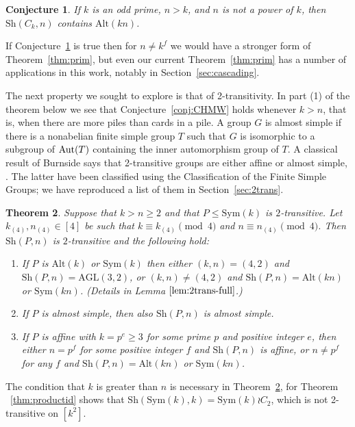 \documentclass[12pt]{amsart}
\newtheorem{thm}{Theorem}[section]
\newtheorem{conj}[thm]{Conjecture}
\theoremstyle{remark}
\theoremstyle{definition}
\newcommand{\sym}{\mathrm{Sym}}
\newcommand{\alt}{\mathrm{Alt}}
\newcommand{\sh}{\mathrm{Sh}}
\newcommand{\AGL}{\mathrm{AGL}}
\newcommand{\aut}{\textnormal{Aut}}
\begin{document}
\begin{conj}\label{conj1}
If $k$ is an odd prime, $n>k$, and $n$ is not a power of $k$, then $\sh(C_k,n)$ contains $\alt(kn)$.
\end{conj}

If Conjecture~\ref{conj1} is true then for $n\neq k^f$ we would have a stronger form of Theorem~\ref{thm:prim}, but even our current 
Theorem~\ref{thm:prim} has a number of applications in this work, notably in Section~\ref{sec:cascading}.

 
The next property we sought to explore is that of 2-transitivity. In part (1) of the theorem below we see that Conjecture~\ref{conj:CHMW} holds whenever $k>n$, that is, when there are more piles than cards in a pile.   A group $G$ is almost simple if there is a nonabelian finite  simple group  $T$ such that $G$ is isomorphic to a subgroup of $\aut(T)$ containing the inner automorphism group of $T$. A classical result of Burnside says that 2-transitive groups are either affine or almost simple, \cite[Theorem 4.1B]{dixmort}.  The latter have been classified using the Classification of the Finite Simple Groups; we have reproduced a list of them in Section~\ref{sec:2trans}.

\begin{thm} \label{thm:2trans}
Suppose that $k>n \geqslant 2$ and that $P\leqslant \sym(k)$ is $2$-transitive. Let $k_{(4)}, n_{(4)} \in [4]$ be such that $k \equiv k_{(4)} \pmod{4}$ and $n \equiv n_{(4)} \pmod{4}$. Then $\sh(P,n)$ is $2$-transitive and the following hold:
	\begin{enumerate}
	\item \label{2tr-alt} If $P$ is $\alt(k)$ or $\sym(k)$ then either $(k,n) = (4,2)$ and $\sh(P,n) = \AGL(3,2)$,  or $(k,n) \neq (4,2)$ and $\sh(P,n) = \alt(kn)$ or $\sym(kn)$. (Details in Lemma $\ref{lem:2trans-full}$.) 
	\item \label{2tr-P-AS} If $P$ is almost simple, then also $\sh(P,n)$ is almost simple.
	\item If $P$ is affine with $k = p^e\geqslant3$ for some prime $p$ and positive integer $e$, then either $n = p^f$ for some positive integer $f$ and $\sh(P,n)$ is affine, or $n \neq p^f$ for any $f$ and $\sh(P,n)=\alt(kn)$ or $\sym(kn)$.
	\end{enumerate}
\end{thm}

The condition that $k$ is greater than $n$ is necessary in Theorem~\ref{thm:2trans}, for Theorem ~\ref{thm:productid} shows that  $\sh(\sym(k),k) = \sym(k)\wr C_2$, which is not 2-transitive on $[k^2]$.
\end{document}
